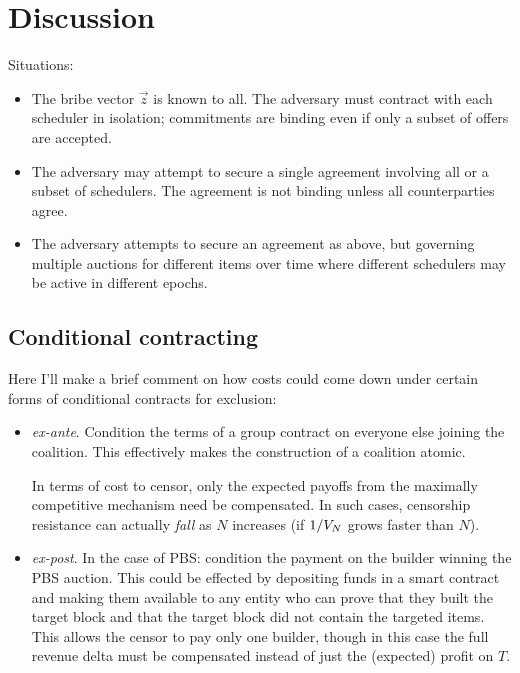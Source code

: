\newpage
\section{Discussion}


Situations:
\begin{itemize}

  \item 
    The bribe vector $\vec{z}$ is known to all. The adversary must contract with each scheduler in isolation; commitments are binding even if only a subset of offers are accepted.

  \item
    The adversary may attempt to secure a single agreement involving all or a subset of schedulers.
    The agreement is not binding unless all counterparties agree.
  
  \item
    The adversary attempts to secure an agreement as above, but governing multiple auctions for different items over time where different schedulers may be active in different epochs.

\end{itemize}

\subsection{Conditional contracting}

Here I'll make a brief comment on how costs could come down under certain forms of conditional contracts for exclusion:

\begin{itemize}
  \item \emph{ex-ante}. 
    Condition the terms of a group contract on everyone else joining the coalition. This effectively makes the construction of a coalition atomic.
    
    In terms of cost to censor, only the expected payoffs from the maximally competitive mechanism need be compensated.
    In such cases, censorship resistance can actually \emph{fall} as $N$ increases (if $1/V_N$ grows faster than $N$).


  \item \emph{ex-post}.
    In the case of PBS: condition the payment on the builder winning the PBS auction. This could be effected by depositing funds in a smart contract and making them available to any entity who can prove that they built the target block and that the target block did not contain the targeted items.
    This allows the censor to pay only one builder, though in this case the full revenue delta must be compensated instead of just the (expected) profit on $T$.

\end{itemize}






